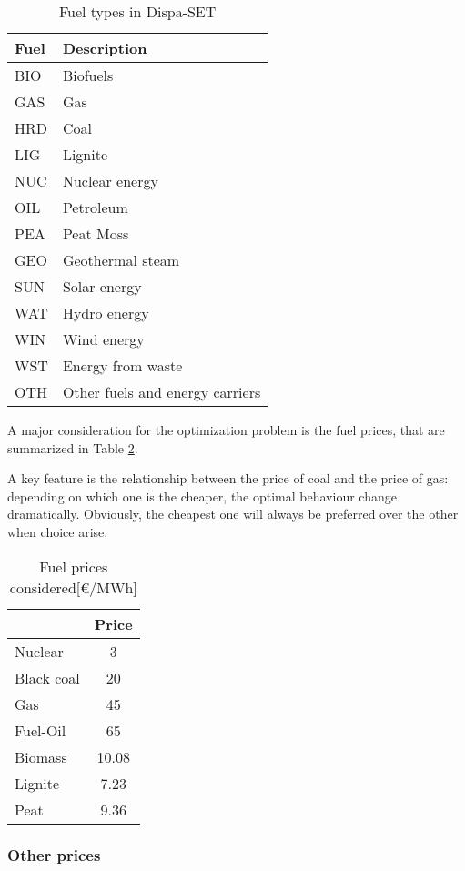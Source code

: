 \begin{table}[h]
    \centering
	\begin{tabular}{|l l|}
		\hline
		Fuel & Description\\
		\hline
		BIO & Biofuels\\
		GAS & Gas\\
		HRD & Coal\\
		LIG & Lignite \\
		NUC & Nuclear energy\\
		OIL & Petroleum\\
		PEA & Peat Moss\\
		GEO & Geothermal steam \\
		SUN & Solar energy\\
		WAT & Hydro energy\\
		WIN & Wind energy\\
		WST & Energy from waste\\
		OTH & Other fuels and energy carriers\\
		\hline
	\end{tabular}
	\caption{Fuel types in Dispa-SET}
	\label{table:fuels-eu}
\end{table}

A major consideration for the optimization problem is the fuel prices, that are summarized in Table \ref{table:fuel-prices}.

A key feature is the relationship between the price of coal and the price of gas: depending on which one is the cheaper, the optimal behaviour change dramatically. Obviously, the cheapest one will always be preferred over the other when choice arise. 

\begin{table}[h]
    \centering
	\begin{tabular}{|l c|}
		\hline
		& Price \\
		\hline
		Nuclear    & 3 \\
		Black coal & 20 \\
		Gas        & 45 \\
		Fuel-Oil   & 65\\
		Biomass    & 10.08\\
		Lignite    & 7.23\\
		Peat       & 9.36 \\
		\hline
	\end{tabular}
	\caption{Fuel prices considered[€/MWh]}
	\label{table:fuel-prices}
\end{table}

\subsubsection{Other prices}

